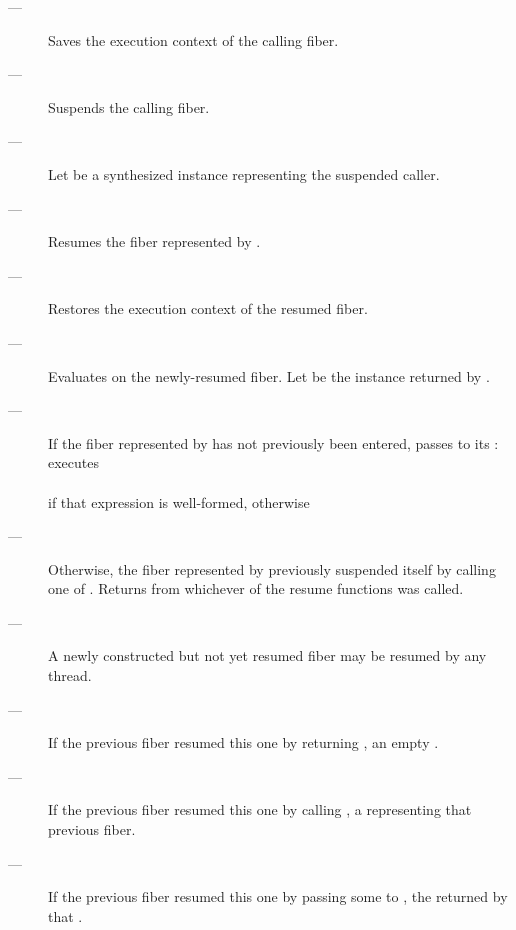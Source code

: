 \effects
\begin{description}
    \item[---] Saves the execution context of the calling fiber.
    \item[---] Suspends the calling fiber.
    \item[---] Let  be a synthesized \fiber instance representing
               the suspended caller.
    \item[---] Resumes the fiber represented by .
    \item[---] Restores the execution context of the resumed fiber.
    \item[---] Evaluates 
               on the newly-resumed fiber.
               Let  be the \fiber instance returned by .
    \item[---] If the fiber represented by  has not previously been
               entered, passes  to its \entryfn: executes\\
               \\
               if that expression is well-formed, otherwise\\
    \item[---] Otherwise, the fiber represented by  previously
               suspended itself by calling one of \anyresume.
               Returns  from whichever of the resume functions
               was called.
\end{description}

\remarks
\begin{description}
    \item[---] A newly constructed but not yet resumed fiber may be resumed by
              any thread.
\end{description}

\returns
\begin{description}
    \item[---] If the previous fiber resumed this one by returning \fiber,
               an empty \fiber.
    \item[---] If the previous fiber resumed this one by calling \someresume,
               a \fiber representing that previous fiber.
    \item[---] If the previous fiber resumed this one by passing some 
               to \anyresumewith, the \fiber returned by that .
\end{description}

